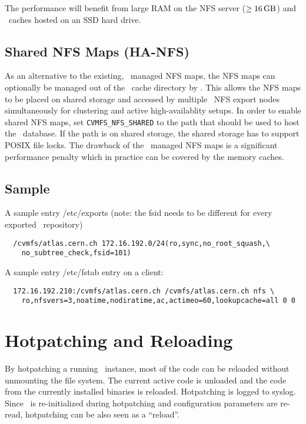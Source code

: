 The performance will benefit from large RAM on the NFS server ($\geq\SI{16}{\giga\byte}$) and \cvmfs\ caches hosted on an SSD hard drive.

\subsection{Shared NFS Maps (HA-NFS)}
As an alternative to the existing, \leveldb\ managed NFS maps, the NFS maps can optionally be managed out of the \cvmfs\ cache directory by \sqlite.
This allows the NFS maps to be placed on shared storage and accessed by multiple \cvmfs\ NFS export nodes simultaneously for clustering and active high-availablity setups.
In order to enable shared NFS maps, set \texttt{CVMFS\_NFS\_SHARED} to the path that should be used to host the \sqlite\ database.  
If the path is on shared storage, the shared storage has to support POSIX file locks.
The drawback of the \sqlite\ managed NFS maps is a significant performance penalty which in practice can be covered by the memory caches.

\subsection{Sample}
A sample entry /etc/exports (note: the fsid needs to be different for every exported \cvmfs\ repository)
\begin{verbatim}
  /cvmfs/atlas.cern.ch 172.16.192.0/24(ro,sync,no_root_squash,\
    no_subtree_check,fsid=101)
\end{verbatim}
A sample entry /etc/fstab entry on a client:
\begin{verbatim}
  172.16.192.210:/cvmfs/atlas.cern.ch /cvmfs/atlas.cern.ch nfs \
    ro,nfsvers=3,noatime,nodiratime,ac,actimeo=60,lookupcache=all 0 0
\end{verbatim}


\section{Hotpatching and Reloading}
\label{sct:hotpatch}

By hotpatching a running \cvmfs\ instance, most of the code can be reloaded without unmounting the file system.
The current active code is unloaded and the code from the currently installed binaries is reloaded.
Hotpatching is logged to syslog.
Since \cvmfs\ is re-initialized during hotpatching and configuration parameters are re-read, hotpatching can be also seen as a ``reload''.

